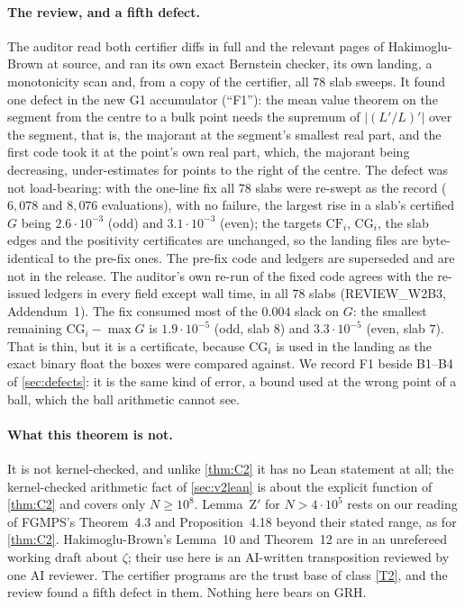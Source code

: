 \documentclass[11pt]{article}
\theoremstyle{definition}
\begin{document}
\paragraph{The review, and a fifth defect.} The auditor read both certifier diffs in full and the relevant pages of Hakimoglu-Brown at source, and ran its own exact Bernstein checker, its own landing, a monotonicity scan and, from a copy of the certifier, all $78$ slab sweeps. It found one defect in the new G1 accumulator (``F1''): the mean value theorem on the segment from the centre to a bulk point needs the supremum of $|(L'/L)'|$ over the segment, that is, the majorant at the segment's smallest real part, and the first code took it at the point's own real part, which, the majorant being decreasing, under-estimates for points to the right of the centre. The defect was not load-bearing: with the one-line fix all $78$ slabs were re-swept as the record ($6{,}078$ and $8{,}076$ evaluations), with no failure, the largest rise in a slab's certified $G$ being $2.6\cdot10^{-3}$ (odd) and $3.1\cdot10^{-3}$ (even); the targets $\mathrm{CF}_i$, $\mathrm{CG}_i$, the slab edges and the positivity certificates are unchanged, so the landing files are byte-identical to the pre-fix ones. The pre-fix code and ledgers are superseded and are not in the release. The auditor's own re-run of the fixed code agrees with the re-issued ledgers in every field except wall time, in all $78$ slabs (REVIEW\_W2B3, Addendum~1). The fix consumed most of the $0.004$ slack on $G$: the smallest remaining $\mathrm{CG}_i - \max G$ is $1.9\cdot10^{-5}$ (odd, slab $8$) and $3.3\cdot10^{-5}$ (even, slab $7$). That is thin, but it is a certificate, because $\mathrm{CG}_i$ is used in the landing as the exact binary float the boxes were compared against. We record F1 beside B1--B4 of \cref{sec:defects}: it is the same kind of error, a bound used at the wrong point of a ball, which the ball arithmetic cannot see.

\paragraph{What this theorem is not.} It is not kernel-checked, and unlike \cref{thm:C2} it has no Lean statement at all; the kernel-checked arithmetic fact of \cref{sec:v2lean} is about the explicit function of \cref{thm:C2} and covers only $N \ge 10^8$. Lemma~Z$'$ for $N > 4\cdot10^5$ rests on our reading of FGMPS's Theorem~4.3 and Proposition~4.18 beyond their stated range, as for \cref{thm:C2}. Hakimoglu-Brown's Lemma~10 and Theorem~12 are in an unrefereed working draft about $\zeta$; their use here is an AI-written transposition reviewed by one AI reviewer. The certifier programs are the trust base of class \ref{T2}, and the review found a fifth defect in them. Nothing here bears on GRH.
\end{document}
